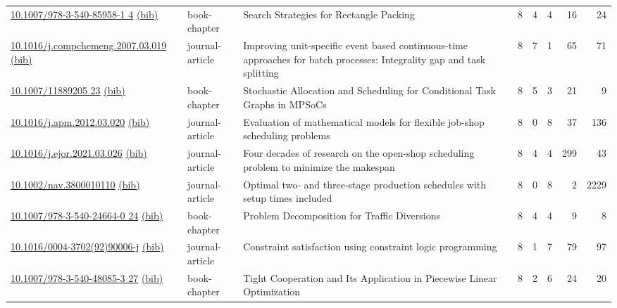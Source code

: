 {\begin{longtable}{p{5cm}lp{11cm}rrrrr}
\href{http://dx.doi.org/10.1007/978-3-540-85958-1_4}{10.1007/978-3-540-85958-1 4} \href{https://www.doi2bib.org/bib/10.1007/978-3-540-85958-1_4}{(bib)} & book-chapter & Search Strategies for Rectangle Packing & 8 & 4 & 4 & 16 & 24 \\
\href{http://dx.doi.org/10.1016/j.compchemeng.2007.03.019}{10.1016/j.compchemeng.2007.03.019} \href{https://www.doi2bib.org/bib/10.1016/j.compchemeng.2007.03.019}{(bib)} & journal-article & Improving unit-specific event based continuous-time approaches for batch processes: Integrality gap and task splitting & 8 & 7 & 1 & 65 & 71 \\
\href{http://dx.doi.org/10.1007/11889205_23}{10.1007/11889205 23} \href{https://www.doi2bib.org/bib/10.1007/11889205_23}{(bib)} & book-chapter & Stochastic Allocation and Scheduling for Conditional Task Graphs in MPSoCs & 8 & 5 & 3 & 21 & 9 \\
\href{http://dx.doi.org/10.1016/j.apm.2012.03.020}{10.1016/j.apm.2012.03.020} \href{https://www.doi2bib.org/bib/10.1016/j.apm.2012.03.020}{(bib)} & journal-article & Evaluation of mathematical models for flexible job-shop scheduling problems & 8 & 0 & 8 & 37 & 136 \\
\href{http://dx.doi.org/10.1016/j.ejor.2021.03.026}{10.1016/j.ejor.2021.03.026} \href{https://www.doi2bib.org/bib/10.1016/j.ejor.2021.03.026}{(bib)} & journal-article & Four decades of research on the open-shop scheduling problem to minimize the makespan & 8 & 4 & 4 & 299 & 43 \\
\href{http://dx.doi.org/10.1002/nav.3800010110}{10.1002/nav.3800010110} \href{https://www.doi2bib.org/bib/10.1002/nav.3800010110}{(bib)} & journal-article & Optimal two‐ and three‐stage production schedules with setup times included & 8 & 0 & 8 & 2 & 2229 \\
\href{http://dx.doi.org/10.1007/978-3-540-24664-0_24}{10.1007/978-3-540-24664-0 24} \href{https://www.doi2bib.org/bib/10.1007/978-3-540-24664-0_24}{(bib)} & book-chapter & Problem Decomposition for Traffic Diversions & 8 & 4 & 4 & 9 & 8 \\
\href{http://dx.doi.org/10.1016/0004-3702(92)90006-j}{10.1016/0004-3702(92)90006-j} \href{https://www.doi2bib.org/bib/10.1016/0004-3702(92)90006-j}{(bib)} & journal-article & Constraint satisfaction using constraint logic programming & 8 & 1 & 7 & 79 & 97 \\
\href{http://dx.doi.org/10.1007/978-3-540-48085-3_27}{10.1007/978-3-540-48085-3 27} \href{https://www.doi2bib.org/bib/10.1007/978-3-540-48085-3_27}{(bib)} & book-chapter & Tight Cooperation and Its Application in Piecewise Linear Optimization & 8 & 2 & 6 & 24 & 20 \\

\end{longtable}}
